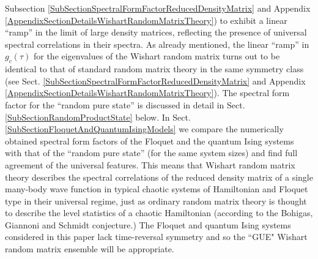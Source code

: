 \documentclass[aps,prb,preprint,onecolumn,amsmath,amssymb,superscriptaddress,eqsecnum,floatfix,scrartcl]{revtex4-1}
\begin{document}
Subsection \ref{SubSectionSpectralFormFactorReducedDensityMatrix} and Appendix \ref{AppendixSectionDetailsWishartRandomMatrixTheory})
 to exhibit a linear ``ramp'' in the limit of
large density matrices,  reflecting the presence of 
universal spectral correlations
in their spectra.
As already mentioned, the linear ``ramp'' in $g_c(\tau)$ for the eigenvalues of the Wishart random matrix turns out to be 
 identical to that of  standard
random matrix theory in the same symmetry class
(see Sect. \ref{SubSectionSpectralFormFactorReducedDensityMatrix} and Appendix \ref{AppendixSectionDetailsWishartRandomMatrixTheory}).
The spectral form factor for the ``random pure state'' is discussed in detail  in Sect. \ref{SubSectionRandomProductState} below.
In Sect. \ref{SubSectionFloquetAndQuantumIsingModels}
we compare the numerically obtained spectral form factors
of the Floquet and the quantum Ising systems with that of the ``random pure state'' (for the same system sizes) and find full agreement
of the universal features. This means
that Wishart random matrix theory describes the  spectral 
correlations
 of the  reduced density matrix of a single many-body wave function
in typical chaotic systems of Hamiltonian and Floquet type in their universal regime, just as  ordinary random matrix theory is thought to describe
the level statistics of a chaotic Hamiltonian (according to
the Bohigas, 
Giannoni and Schmidt conjecture\cite{BohigasGiannoniSchmidtConjecture}.) 
The  Floquet and quantum Ising systems considered  in this paper
lack time-reversal symmetry and so the ``GUE" Wishart random matrix ensemble  will be
appropriate.
\end{document}
